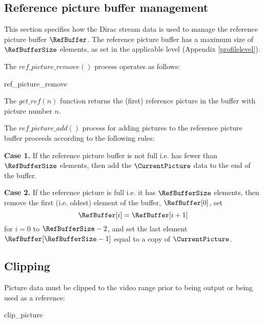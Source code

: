 \subsection{Reference picture buffer management}
\label{refbuffer}

This section specifies how the Dirac stream data is used to manage the reference 
picture buffer $\RefBuffer$. The reference picture buffer has a maximum size of
$\RefBufferSize$ elements, as set in the applicable level (Appendix \ref{profilelevel}).

The $ref\_picture\_remove()$ process operates as
follows:

\begin{pseudo}{ref\_picture\_remove}{}
                \bsCODE{\RefBuffer[j]=\RefBuffer[j+1]}
            \bsEND
        \bsEND
    \bsEND
\bsEND
\bsCODE{\RetiredPictureList=\emptyset}
\end{pseudo}

The $get\_ref(n)$ function returns the (first) reference picture in the buffer with 
picture number $n$.  

The $ref\_picture\_add()$ process for adding pictures to the reference picture
buffer proceeds according to the following rules:

{\bf Case 1.} If the reference picture buffer is not full i.e. has fewer than $\RefBufferSize$ elements,
then add the $\CurrentPicture$ data to the end of the buffer. 

{\bf Case 2.} If the reference picture is full i.e. it has $\RefBufferSize$ elements, then remove the
first (i.e. oldest) element of the buffer, $\RefBuffer[0]$, set
\[\RefBuffer[i] = \RefBuffer[i+1] \]
for $i=0$ to $\RefBufferSize-2$, and set the last element $\RefBuffer[\RefBufferSize-1]$ equal to
a copy of $\CurrentPicture$.
 
\subsection{Clipping}
\label{pictureclip}

Picture data must be clipped to the video range prior to being output or being
used as a reference:

\begin{pseudo}{clip\_picture}{}
\bsEND
\end{pseudo}

